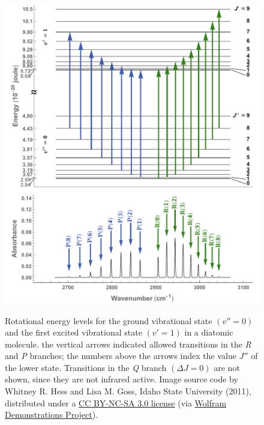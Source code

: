 \documentclass[nobib,nofonts,nols,nohyper]{tufte-handout}
\begin{document}
\begin{figure}[htb]
  \centering
	  \caption{Rotational energy levels for the ground vibrational state \( (v'' = 0) \) and the first excited vibrational state \( ( v' = 1) \) in a diatomic molecule. 
			the vertical arrows indicated allowed transitions in the \emph{R} and \emph{P} branches; the numbers above the arrows index the value \( J'' \) of the lower state. 
			Transitions in the \emph{Q} branch \( (\Delta J = 0) \) are not shown, since they are not infrared active. 
			Image source code by Whitney R. Hess and Lisa M. Goss, Idaho State University (2011), distributed under a \href{http://creativecommons.org/licenses/by-nc-sa/3.0}{CC BY-NC-SA 3.0 license} 
			(via \href{http://demonstrations.wolfram.com/RotationVibrationEnergyLevelTransitionsOfADiatomicRotor/}{Wolfram Demonstrations Project}). 
		}
		\includegraphics[width=.9\textwidth]{images/rot_energy_levels.pdf}
		\label{fig:typ_spectrum}
\end{figure}
\end{document}

